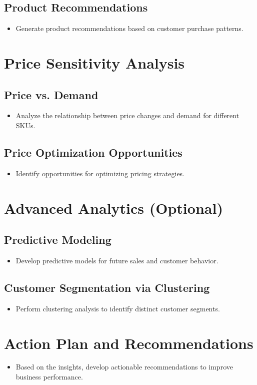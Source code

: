 \documentclass{article}
\begin{document}
    \subsection{Product Recommendations}
    \begin{itemize}
        \item Generate product recommendations based on customer purchase patterns.
    \end{itemize}

\section{Price Sensitivity Analysis}
    \subsection{Price vs. Demand}
    \begin{itemize}
        \item Analyze the relationship between price changes and demand for different SKUs.
    \end{itemize}
    
    \subsection{Price Optimization Opportunities}
    \begin{itemize}
        \item Identify opportunities for optimizing pricing strategies.
    \end{itemize}

\section{Advanced Analytics (Optional)}
    \subsection{Predictive Modeling}
    \begin{itemize}
        \item Develop predictive models for future sales and customer behavior.
    \end{itemize}
    
    \subsection{Customer Segmentation via Clustering}
    \begin{itemize}
        \item Perform clustering analysis to identify distinct customer segments.
    \end{itemize}

\section{Action Plan and Recommendations}
    \begin{itemize}
        \item Based on the insights, develop actionable recommendations to improve business performance.
    \end{itemize}
\end{document}
